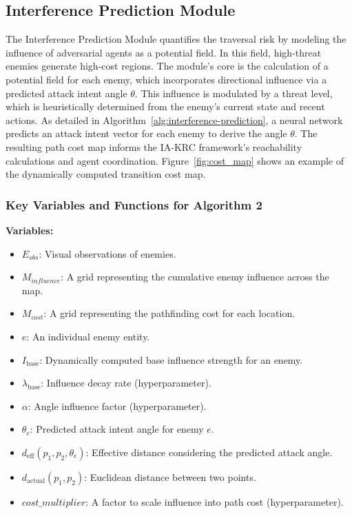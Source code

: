 \subsection{Interference Prediction Module}
The Interference Prediction Module quantifies the traversal risk by modeling the influence of adversarial agents as a potential field. In this field, high-threat enemies generate high-cost regions. The module's core is the calculation of a potential field for each enemy, which incorporates directional influence via a predicted attack intent angle $\theta$. This influence is modulated by a threat level, which is heuristically determined from the enemy's current state and recent actions. As detailed in Algorithm~\ref{alg:interference-prediction}, a neural network predicts an attack intent vector for each enemy to derive the angle $\theta$. The resulting path cost map informs the IA-KRC framework's reachability calculations and agent coordination. Figure~\ref{fig:cost_map} shows an example of the dynamically computed transition cost map.

\subsubsection{Key Variables and Functions for Algorithm 2\\}
\textbf{Variables:}

\begin{itemize}
\item $E_{obs}$: Visual observations of enemies.
\item $M_{influence}$: A grid representing the cumulative enemy influence across the map.
\item $M_{cost}$: A grid representing the pathfinding cost for each location.
\item $e$: An individual enemy entity.
\item $I_{\text{base}}$: Dynamically computed base influence strength for an enemy.
\item $\lambda_{\text{base}}$: Influence decay rate (hyperparameter).
\item $\alpha$: Angle influence factor (hyperparameter).
\item $\theta_e$: Predicted attack intent angle for enemy $e$.
\item $d_{\text{eff}}(p_1, p_2, \theta_e)$: Effective distance considering the predicted attack angle.
\item $d_{\text{actual}}(p_1, p_2)$: Euclidean distance between two points.
\item $cost\_multiplier$: A factor to scale influence into path cost (hyperparameter).
\end{itemize}

